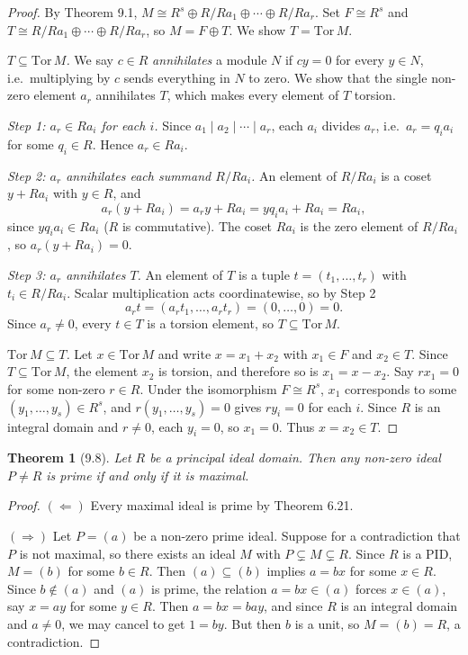 \documentclass[12pt]{article}
\newtheorem{theorem}{Theorem}
\begin{document}
\begin{proof}
By Theorem 9.1, $M \cong R^s \oplus R/Ra_1 \oplus \cdots \oplus R/Ra_r$. Set $F \cong R^s$ and $T \cong R/Ra_1 \oplus \cdots \oplus R/Ra_r$, so $M = F \oplus T$. We show $T = \mathrm{Tor}\, M$.

\textit{$T \subseteq \mathrm{Tor}\, M$.} We say $c \in R$ \emph{annihilates} a module $N$ if $cy = 0$ for every $y \in N$, i.e.\ multiplying by $c$ sends everything in $N$ to zero. We show that the single non-zero element $a_r$ annihilates $T$, which makes every element of $T$ torsion.

\textit{Step 1: $a_r \in Ra_i$ for each $i$.} Since $a_1 \mid a_2 \mid \cdots \mid a_r$, each $a_i$ divides $a_r$, i.e.\ $a_r = q_i a_i$ for some $q_i \in R$. Hence $a_r \in Ra_i$.

\textit{Step 2: $a_r$ annihilates each summand $R/Ra_i$.} An element of $R/Ra_i$ is a coset $y + Ra_i$ with $y \in R$, and
\[
  a_r(y + Ra_i) = a_r y + Ra_i = y q_i a_i + Ra_i = Ra_i,
\]
since $yq_ia_i \in Ra_i$ ($R$ is commutative). The coset $Ra_i$ is the zero element of $R/Ra_i$, so $a_r(y + Ra_i) = 0$.

\textit{Step 3: $a_r$ annihilates $T$.} An element of $T$ is a tuple $t = (t_1, \ldots, t_r)$ with $t_i \in R/Ra_i$. Scalar multiplication acts coordinatewise, so by Step 2
\[
  a_r t = (a_r t_1, \ldots, a_r t_r) = (0, \ldots, 0) = 0.
\]
Since $a_r \neq 0$, every $t \in T$ is a torsion element, so $T \subseteq \mathrm{Tor}\, M$.

\textit{$\mathrm{Tor}\, M \subseteq T$.} Let $x \in \mathrm{Tor}\, M$ and write $x = x_1 + x_2$ with $x_1 \in F$ and $x_2 \in T$. Since $T \subseteq \mathrm{Tor}\, M$, the element $x_2$ is torsion, and therefore so is $x_1 = x - x_2$. Say $rx_1 = 0$ for some non-zero $r \in R$. Under the isomorphism $F \cong R^s$, $x_1$ corresponds to some $(y_1, \ldots, y_s) \in R^s$, and $r(y_1, \ldots, y_s) = 0$ gives $ry_i = 0$ for each $i$. Since $R$ is an integral domain and $r \neq 0$, each $y_i = 0$, so $x_1 = 0$. Thus $x = x_2 \in T$.
\end{proof}

\begin{theorem}[9.8]
Let $R$ be a principal ideal domain. Then any non-zero ideal $P \neq R$ is prime if and only if it is maximal.
\end{theorem}

\begin{proof}
$(\Leftarrow)$ Every maximal ideal is prime by Theorem 6.21.

$(\Rightarrow)$ Let $P = (a)$ be a non-zero prime ideal. Suppose for a contradiction that $P$ is not maximal, so there exists an ideal $M$ with $P \subsetneq M \subsetneq R$. Since $R$ is a PID, $M = (b)$ for some $b \in R$. Then $(a) \subseteq (b)$ implies $a = bx$ for some $x \in R$. Since $b \notin (a)$ and $(a)$ is prime, the relation $a = bx \in (a)$ forces $x \in (a)$, say $x = ay$ for some $y \in R$. Then $a = bx = bay$, and since $R$ is an integral domain and $a \neq 0$, we may cancel to get $1 = by$. But then $b$ is a unit, so $M = (b) = R$, a contradiction.
\end{proof}
\end{document}
